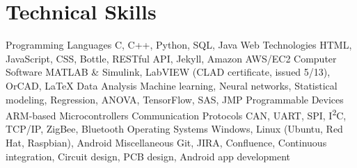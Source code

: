 \section{Technical Skills}
\begin{cvskills}
  \cvskill
    {Programming Languages}
    {C, C++, Python, SQL, Java}
  \cvskill
    {Web Technologies}
    {HTML, JavaScript, CSS, Bottle, RESTful API, Jekyll, Amazon AWS/EC2}
  \cvskill
    {Computer Software}
    {MATLAB \& Simulink, LabVIEW (CLAD certificate, issued 5/13), OrCAD, LaTeX}
  \cvskill
    {Data Analysis}
    {Machine learning, Neural networks, Statistical modeling, Regression, ANOVA, TensorFlow, SAS, JMP}
  \cvskill
    {Programmable Devices}
    {ARM-based Microcontrollers}
  \cvskill
    {Communication Protocols}
    {CAN, UART, SPI, I\textsuperscript{2}C, TCP/IP, ZigBee, Bluetooth}
  \cvskill
    {Operating Systems}
    {Windows, Linux (Ubuntu, Red Hat, Raspbian), Android}
  \cvskill
    {Miscellaneous}
    {Git, JIRA, Confluence, Continuous integration, Circuit design, PCB design, Android app development}
\end{cvskills} 